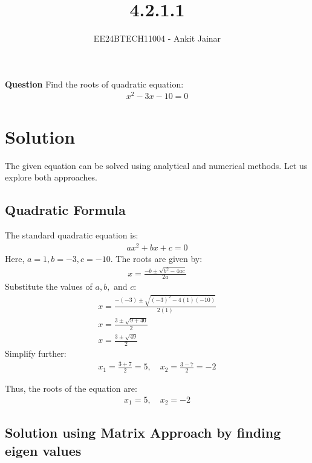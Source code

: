 \documentclass[journal]{IEEEtran}
\begin{document}

\vspace{3cm}

\title{4.2.1.1}
\author{EE24BTECH11004 - Ankit Jainar}
\maketitle

\renewcommand{\thefigure}{\theenumi}
\renewcommand{\thetable}{\theenumi}
\setlength{\intextsep}{10pt}


\textbf{Question}
Find the roots of quadratic equation:\\
\begin{align}
    x^2 - 3x - 10 = 0
\end{align}

\section*{Solution}
The given equation can be solved using analytical and numerical methods. Let us explore both approaches.

\subsection*{ Quadratic Formula}
The standard quadratic equation is:
\begin{align}
    ax^2 + bx + c = 0
\end{align}
Here, \( a = 1, b = -3, c = -10 \). The roots are given by:
\begin{align}
    x = \frac{-b \pm \sqrt{b^2 - 4ac}}{2a}
\end{align}
Substitute the values of \( a, b, \) and \( c \):
\begin{align}
    x = \frac{-(-3) \pm \sqrt{(-3)^2 - 4(1)(-10)}}{2(1)} \\
    x = \frac{3 \pm \sqrt{9 + 40}}{2} \\
    x = \frac{3 \pm \sqrt{49}}{2}
\end{align}
Simplify further:
\begin{align}
    x_1 = \frac{3 + 7}{2} = 5, \quad x_2 = \frac{3 - 7}{2} = -2
\end{align}

Thus, the roots of the equation are:
\begin{align}
    x_1 = 5, \quad x_2 = -2
\end{align}
\subsection*{ Solution using Matrix Approach by finding eigen values}
\end{document}
